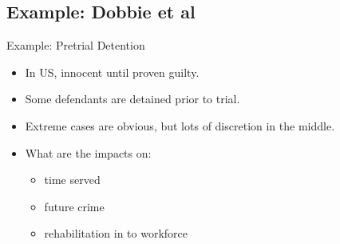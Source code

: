 \subsection{Example: Dobbie et al}

\begin{frame}{Example: Pretrial Detention}
  \begin{itemize}
  \item In US, innocent until proven guilty. 
  \item Some defendants are detained prior to trial. 
  \item Extreme cases are obvious, but lots of discretion in the middle. 
  \item What are the impacts on: 
    \begin{itemize}
      \item time served
      \item future crime
      \item rehabilitation in to workforce
    \end{itemize}  
  \end{itemize}
  \nocite{DobbieGoldinYangBail}
\end{frame}

